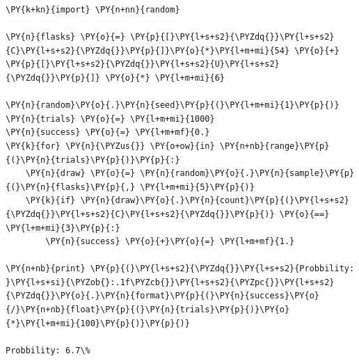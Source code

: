 \begin{Answer}
\begin{tcolorbox}[breakable, size=fbox, boxrule=1pt, pad at break*=1mm,colback=cellbackground, colframe=cellborder]
\begin{Verbatim}[commandchars=\\\{\}]
\PY{k+kn}{import} \PY{n+nn}{random}

\PY{n}{flasks} \PY{o}{=} \PY{p}{[}\PY{l+s+s2}{\PYZdq{}}\PY{l+s+s2}{C}\PY{l+s+s2}{\PYZdq{}}\PY{p}{]}\PY{o}{*}\PY{l+m+mi}{54} \PY{o}{+} \PY{p}{[}\PY{l+s+s2}{\PYZdq{}}\PY{l+s+s2}{U}\PY{l+s+s2}{\PYZdq{}}\PY{p}{]} \PY{o}{*} \PY{l+m+mi}{6}

\PY{n}{random}\PY{o}{.}\PY{n}{seed}\PY{p}{(}\PY{l+m+mi}{1}\PY{p}{)}
\PY{n}{trials} \PY{o}{=} \PY{l+m+mi}{1000}
\PY{n}{success} \PY{o}{=} \PY{l+m+mf}{0.}
\PY{k}{for} \PY{n}{\PYZus{}} \PY{o+ow}{in} \PY{n+nb}{range}\PY{p}{(}\PY{n}{trials}\PY{p}{)}\PY{p}{:}
    \PY{n}{draw} \PY{o}{=} \PY{n}{random}\PY{o}{.}\PY{n}{sample}\PY{p}{(}\PY{n}{flasks}\PY{p}{,} \PY{l+m+mi}{5}\PY{p}{)}
    \PY{k}{if} \PY{n}{draw}\PY{o}{.}\PY{n}{count}\PY{p}{(}\PY{l+s+s2}{\PYZdq{}}\PY{l+s+s2}{C}\PY{l+s+s2}{\PYZdq{}}\PY{p}{)} \PY{o}{==} \PY{l+m+mi}{3}\PY{p}{:}
        \PY{n}{success} \PY{o}{+}\PY{o}{=} \PY{l+m+mf}{1.}
        
\PY{n+nb}{print} \PY{p}{(}\PY{l+s+s2}{\PYZdq{}}\PY{l+s+s2}{Probbility: }\PY{l+s+si}{\PYZob{}:.1f\PYZcb{}}\PY{l+s+s2}{\PYZpc{}}\PY{l+s+s2}{\PYZdq{}}\PY{o}{.}\PY{n}{format}\PY{p}{(}\PY{n}{success}\PY{o}{/}\PY{n+nb}{float}\PY{p}{(}\PY{n}{trials}\PY{p}{)}\PY{o}{*}\PY{l+m+mi}{100}\PY{p}{)}\PY{p}{)}

Probbility: 6.7\%
\end{Verbatim}
\end{tcolorbox}
\end{Answer}

